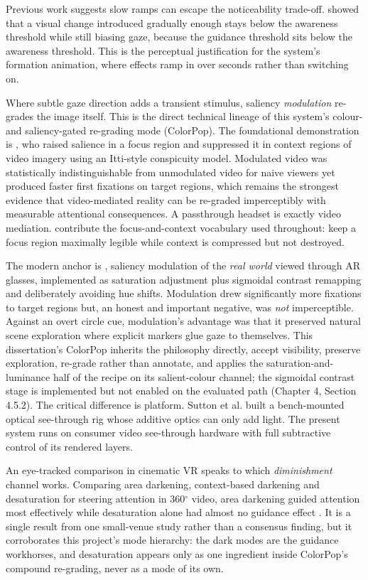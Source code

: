 Previous work suggests slow ramps can escape the noticeability trade-off. \citet{hata2016} showed
that a visual change introduced gradually enough stays below the awareness threshold while still
biasing gaze, because the guidance threshold sits below the awareness threshold. This is the perceptual
justification for the system's formation animation, where effects ramp in over seconds rather than
switching on.

Where subtle gaze direction adds a transient stimulus, saliency \textit{modulation} re-grades the
image itself. This is the direct technical lineage of this system's colour- and saliency-gated
re-grading mode (ColorPop). The foundational demonstration is \citet{veas2011}, who raised salience in a focus region and
suppressed it in context regions of video imagery using an Itti-style conspicuity model. Modulated
video was statistically indistinguishable from unmodulated video for naive viewers yet produced
faster first fixations on target regions, which remains the strongest evidence that video-mediated
reality can be re-graded imperceptibly with measurable attentional consequences. A passthrough
headset is exactly video mediation. \citet{kalkofen2007} contribute the focus-and-context vocabulary
used throughout: keep a focus region maximally legible while context is compressed but not
destroyed.

The modern anchor is \citet{sutton2022}, saliency modulation of the \textit{real world} viewed
through AR glasses, implemented as saturation adjustment plus sigmoidal contrast remapping and
deliberately avoiding hue shifts. Modulation drew significantly more fixations to target regions but,
an honest and important negative, was \textit{not} imperceptible. Against an overt circle cue,
modulation's advantage was that it preserved natural scene exploration where explicit markers glue
gaze to themselves. This dissertation's ColorPop inherits the philosophy directly, accept visibility,
preserve exploration, re-grade rather than annotate, and applies the saturation-and-luminance half of
the recipe on its salient-colour channel; the sigmoidal contrast stage is implemented but not enabled
on the evaluated path (Chapter 4, Section 4.5.2). The critical difference is platform. Sutton et al. built
a bench-mounted optical see-through rig whose additive optics can only add light. The present system
runs on consumer video see-through hardware with full subtractive control of its rendered layers.

An eye-tracked comparison in cinematic VR speaks to which \textit{diminishment} channel works.
Comparing area darkening, context-based darkening and desaturation for steering attention in
360$^{\circ}$ video, area darkening guided attention most effectively while desaturation alone had
almost no guidance effect \citep{wang2020}. It is a single result from one small-venue study rather
than a consensus finding, but it corroborates this project's mode hierarchy: the dark modes are the
guidance workhorses, and desaturation appears only as one ingredient inside ColorPop's compound
re-grading, never as a mode of its own.

